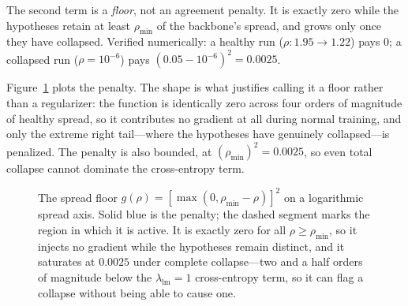 \documentclass[11pt,a4paper]{article}
\newcommand{\rhodim}{\rho}
\newcommand{\lam}{\lambda}
\theoremstyle{plain}
\theoremstyle{definition}
\theoremstyle{remark}
\begin{document}
\noindent
The second term is a \emph{floor}, not an agreement penalty. It is exactly
zero while the hypotheses retain at least $\rhodim_{\min}$ of the backbone's
spread, and grows only once they have collapsed. Verified numerically: a
healthy run ($\rhodim: 1.95 \to 1.22$) pays $0$; a collapsed run
($\rhodim = 10^{-6}$) pays $(0.05 - 10^{-6})^2 = 0.0025$.

Figure~\ref{fig:floor} plots the penalty. The shape is what justifies calling
it a floor rather than a regularizer: the function is identically zero across
four orders of magnitude of healthy spread, so it contributes no gradient at all
during normal training, and only the extreme right tail---where the hypotheses
have genuinely collapsed---is penalized. The penalty is also bounded, at
$(\rhodim_{\min})^2 = 0.0025$, so even total collapse cannot dominate the
cross-entropy term.

\begin{figure}[htbp]
\centering
{}
\caption{The spread floor $g(\rho) = [\max(0, \rhodim_{\min} - \rho)]^2$ on a
logarithmic spread axis. Solid blue is the penalty; the dashed segment marks the
region in which it is active. It is exactly zero for all
$\rho \ge \rhodim_{\min}$, so it injects no gradient while the hypotheses remain
distinct, and it saturates at $0.0025$ under complete collapse---two and a half
orders of magnitude below the $\lam_{\mathrm{lm}} = 1$ cross-entropy term, so it
can flag a collapse without being able to cause one.}
\label{fig:floor}
\end{figure}
\end{document}
